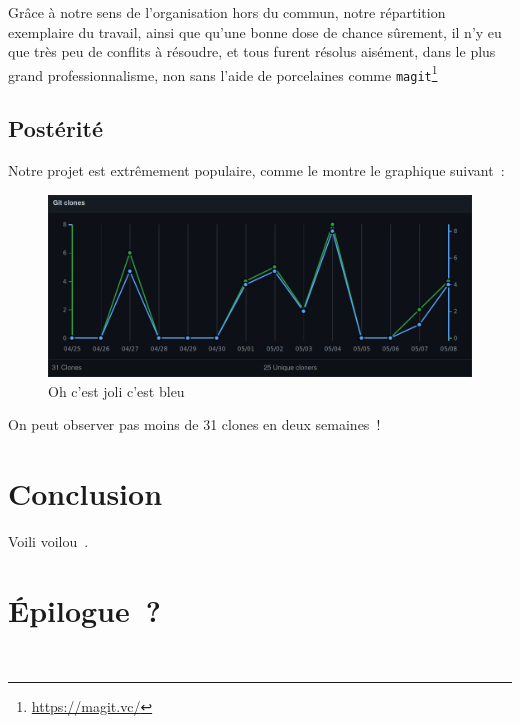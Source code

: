 \documentclass[a4, 12pt, titlepage]{scrartcl}
\begin{document}
Grâce à notre sens de l'organisation hors du commun, notre répartition
exemplaire du travail, ainsi que qu'une bonne dose de chance sûrement,
il n'y eu que très peu de conflits à résoudre, et tous furent résolus
aisément, dans le plus grand professionnalisme, non sans l'aide de
porcelaines comme \texttt{magit}\footnote{\url{https://magit.vc/}}

\subsection{Postérité}\label{subsec:32}

Notre projet est extrêmement populaire, comme le montre le graphique
suivant~:

\begin{figure}[H]
  \centering
  \includegraphics[width=\linewidth]{figures/clones.png}
  \caption{\label{fig:clones} Oh c'est joli c'est bleu}
\end{figure}

On peut observer pas moins de 31 clones en deux semaines~!

\section*{Conclusion}
Voili voilou~\cite{Landin66}.

\section*{Épilogue~?}

\newpage
\begin{center}
{\Huge {}~\cite{Tchana21}}
\end{center}



\end{document}
